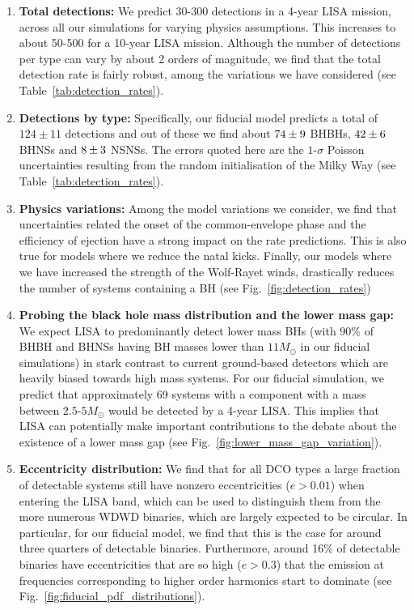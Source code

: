 \begin{enumerate}
    \item \textbf{Total detections:} We predict 30-300 detections in a 4-year LISA mission, across all our simulations for varying physics assumptions. This increases to about 50-500 for a 10-year LISA mission. Although the number of detections per type can vary by about 2 orders of magnitude, we find that the total detection rate is fairly robust, among the variations we have considered (see Table~\ref{tab:detection_rates}).
    
     \item \textbf{Detections by type:} Specifically, our fiducial model predicts a total of $124 \pm 11$ detections and out of these we find about $74{}\pm 9$ BHBHs, $42{}\pm 6$ BHNSs and $8{}\pm 3$ NSNSs. The errors quoted here are the $1$-$\sigma$ Poisson uncertainties resulting from the random initialisation of the Milky Way (see Table~\ref{tab:detection_rates}).
    
    \item \textbf{Physics variations:}  Among the model variations we consider, we find that uncertainties related the onset of the common-envelope phase and the efficiency of ejection have a strong impact on the rate predictions. This is also true for models where we reduce the natal kicks. Finally, our models where we have increased the strength of the Wolf-Rayet winds, drastically reduces the number of systems containing a BH (see Fig.~\ref{fig:detection_rates})
    
    \item \textbf{Probing the black hole mass distribution and the lower mass gap:} We expect LISA to predominantly detect lower mass BHs (with 90\% of BHBH and BHNSs having BH masses lower than $11 \unit{M_\odot}$ in our fiducial simulations) in stark contrast to current ground-based detectors which are heavily biased towards high mass systems. For our fiducial simulation, we predict that approximately 69 systems with a component with a mass between $2.5$-$5 \unit{M_\odot}$ would be detected by a 4-year LISA. This implies that LISA can potentially make important contributions to the debate about the existence of a lower mass gap (see Fig.~\ref{fig:lower_mass_gap_variation}).
    
    \item \textbf{Eccentricity distribution:} We find that for all DCO types a large fraction of detectable systems still have nonzero eccentricities ($e > 0.01$) when entering the LISA band, which can be used to distinguish them from the more numerous WDWD binaries, which are largely expected to be circular. In particular, for our fiducial model, we find that this is the case for around three quarters of detectable binaries. Furthermore, around 16\% of detectable binaries have eccentricities that are so high ($e > 0.3$) that the emission at frequencies corresponding to higher order harmonics start to dominate (see Fig.~\ref{fig:fiducial_pdf_distributions}).
    

\end{enumerate}

